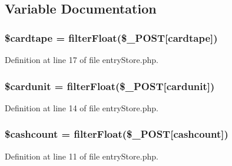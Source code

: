 \subsection{Variable Documentation}
\subsubsection[{\texorpdfstring{\$cardtape}{$cardtape}}]{\setlength{\rightskip}{0pt plus 5cm}\$cardtape = {\bf filter\+Float}(\$\+\_\+\+P\+O\+ST\mbox{[}\textquotesingle{}cardtape\textquotesingle{}\mbox{]})}\hypertarget{entry_store_8php_a2ba025244de3aca4d8d092158ce050d5}{}\label{entry_store_8php_a2ba025244de3aca4d8d092158ce050d5}


Definition at line 17 of file entry\+Store.\+php.

\subsubsection[{\texorpdfstring{\$cardunit}{$cardunit}}]{\setlength{\rightskip}{0pt plus 5cm}\$cardunit = {\bf filter\+Float}(\$\+\_\+\+P\+O\+ST\mbox{[}\textquotesingle{}cardunit\textquotesingle{}\mbox{]})}\hypertarget{entry_store_8php_a18ec05411c100d20ef6c1c9c96c742f0}{}\label{entry_store_8php_a18ec05411c100d20ef6c1c9c96c742f0}


Definition at line 14 of file entry\+Store.\+php.

\subsubsection[{\texorpdfstring{\$cashcount}{$cashcount}}]{\setlength{\rightskip}{0pt plus 5cm}\$cashcount = {\bf filter\+Float}(\$\+\_\+\+P\+O\+ST\mbox{[}\textquotesingle{}cashcount\textquotesingle{}\mbox{]})}\hypertarget{entry_store_8php_a175ae5360f80b9afcc39b1491f4ff56f}{}\label{entry_store_8php_a175ae5360f80b9afcc39b1491f4ff56f}


Definition at line 11 of file entry\+Store.\+php.

